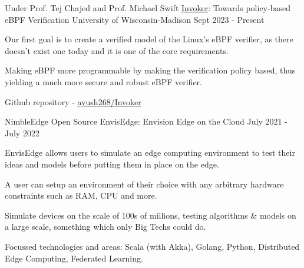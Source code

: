 

\begin{cventries}

  \cventry
    {Under Prof. Tej Chajed and Prof. Michael Swift} %
    {\href{https://github.com/ayush268/Invoker}{Invoker}: Towards policy-based eBPF Verification} %
    {University of Wisconsin-Madison} %
    {Sept 2023 - Present} %
    {
      \begin{cvitems} %
      \item {Our first goal is to create a verified model of the Linux's eBPF verifier, as there doesn't exist one today and it is one of the core requirements.}
      \item {Making eBPF more programmable by making the verification policy based, thus yielding a much more secure and robust eBPF verifier.}
      \item {Github repository - \href{https://github.com/ayush268/Invoker}{ayush268/Invoker}}
      \end{cvitems}
    }



  \cventry
    {NimbleEdge Open Source} %
    {EnvisEdge: Envision Edge on the Cloud} %
    {} %
    {July 2021 - July 2022} %
    {
      \begin{cvitems} %
      \item {EnvisEdge allows users to simulate an edge computing environment to test their ideas and models before putting them in place on the edge.}
      \item {A user can setup an environment of their choice with any arbitrary hardware constraints such as RAM, CPU and more.}
      \item {Simulate devices on the scale of 100s of millions, testing algorithms \& models on a large scale, something which only Big Techs could do.}
      \item {Focussed technologies and areas: Scala (with Akka), Golang, Python, Distributed Edge Computing, Federated Learning.}
      \end{cvitems}
    }


\end{cventries}
